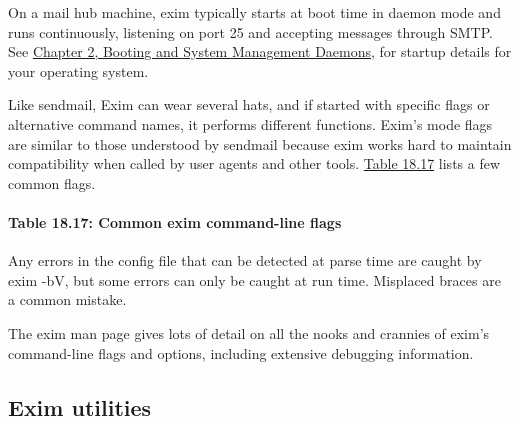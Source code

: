 On a mail hub machine, {exim} typically starts at boot time in daemon
mode and runs continuously, listening on port 25 and accepting messages
through SMTP. See
\protect\hyperlink{part0009_split_000.htmlux5cux23_idTextAnchor065}{Chapter
2, {Booting and System Management Daemons}}, for startup details for
your operating system.

Like {sendmail}, Exim can wear several hats, and if started with
specific flags or alternative command names, it performs different
functions. Exim's mode flags are similar to those understood by
{sendmail} because {exim} works hard to maintain compatibility when
called by user agents and other tools.
\protect\hyperlink{part0026_split_042.htmlux5cux23_idTextAnchor1130}{Table
18.17} lists a few common flags.

\paragraph[{Table 18.17: }Common {exim} command-line
flags]{\texorpdfstring{{Table 18.17:
}\protect\hypertarget{part0026_split_042.htmlux5cux23_idIndexMarker2620}{}{}\protect\hypertarget{part0026_split_042.htmlux5cux23_idTextAnchor1130}{}{}\protect\hypertarget{part0026_split_042.htmlux5cux23_idTextAnchor1131}{}{}Common
{exim} command-line
flags\protect\hypertarget{part0026_split_042.htmlux5cux23_idIndexMarker2621}{}{}\protect\hypertarget{part0026_split_042.htmlux5cux23_idIndexMarker2622}{}{}}{Table 18.17: Common exim command-line flags}}


Any errors in the config file that can be detected at parse time are
caught by {exim -bV}, but some errors can only be caught at run time.
Misplaced braces are a common mistake.

The {exim} man page gives lots of detail on all the nooks and crannies
of {exim}'s command-line flags and options, including extensive
debugging information.

\protect\hypertarget{part0026_split_043.html}{}{}

\hypertarget{part0026_split_043.htmlux5cux23_idContainer1247}{}
\hypertarget{part0026_split_043.htmlux5cux23calibre_pb_42}{%
\subsection[Exim
utilities]{\texorpdfstring{\protect\hypertarget{part0026_split_043.htmlux5cux23_idTextAnchor1132}{}{}Exim
utilities}{Exim utilities}}\label{part0026_split_043.htmlux5cux23calibre_pb_42}}

